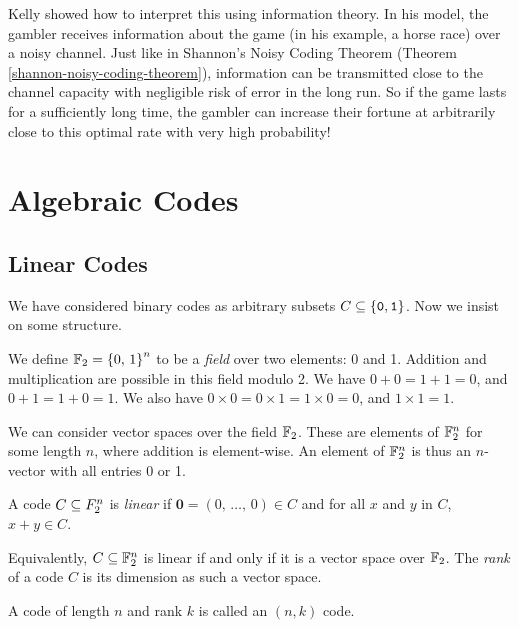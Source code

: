 \documentclass{article}
\begin{document}
Kelly showed how to interpret this using information theory.
In his model, the gambler receives information about the game
(in his example, a horse race) over a noisy channel.
Just like in Shannon's Noisy Coding Theorem
(Theorem \ref{shannon-noisy-coding-theorem}),
information can be transmitted close to the channel capacity
with negligible risk of error in the long run. So if the game lasts for a sufficiently long time, the gambler can increase their fortune at arbitrarily close to this optimal rate with very high probability!



\pagebreak
\section{Algebraic Codes}
\subsection{Linear Codes}
\label{subsection-linear-codes}

We have considered binary codes as arbitrary subsets $C \subseteq \left\lbrace \texttt{0}, \texttt{1} \right\rbrace$.
Now we insist on some structure.

\begin{definition}
	\label{field-of-two-elements}
    We define $\mathbb{F}_2 = \left\lbrace 0, \, 1 \right\rbrace^n$ to be a \textit{field}
    over two elements: 0 and 1.
    Addition and multiplication are possible in this field modulo 2.
    We have $0 + 0 = 1 + 1 = 0$, and $0 + 1 = 1 + 0 = 1$.
    We also have $0 \times 0 = 0 \times 1 = 1 \times 0 = 0$, and $1 \times 1 = 1$.
\end{definition}

We can consider vector spaces over the field $\mathbb{F}_2$.
These are elements of $\mathbb{F}_2^n$ for some length $n$,
where addition is element-wise.
An element of $\mathbb{F}_2^n$ is thus an $n$-vector with all entries 0 or 1.

\begin{definition}
    A code $C \subseteq F_2^n$ is \textit{linear}
    if $\mathbf{0} = (0, \, \dots, \, 0) \in C$ and
    for all $x$ and $y$ in $C$, $x + y \in C$.
    
    Equivalently, $C \subseteq \mathbb{F}_2^n$ is linear
    if and only if it is a vector space over $\mathbb{F}_2$.
    The \textit{rank} of a code $C$ is its dimension as such a vector space.
\end{definition}

\begin{note}
	A code of length $n$ and rank $k$ is called an $(n, k)$ code.
\end{note}
\end{document}

